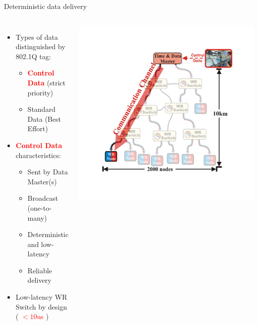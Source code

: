 \documentclass[compress,red]{beamer}
\begin{document}
\begin{frame}{Deterministic data delivery}

\begin{columns}[c]
    \begin{itemize}
      \item Types of data distinguished by 802.1Q tag:
	  \begin{itemize}
	    \item \textcolor{red}{\bf Control Data} (strict priority)
	    \item Standard Data (Best Effort)
	  \end{itemize}
	  \item \textcolor{red}{\bf Control Data} characteristics:
	  \begin{itemize}
      \item Sent by Data Master(s)
	    \item Broadcast (one-to-many)
	    \item Deterministic and low-latency
	    \item Reliable delivery
	  \end{itemize}
    \item Low-latency WR Switch by design ( \textcolor{red}{$<10$us} )
    \end{itemize}
    \begin{center}
    \includegraphics[height=0.65\textheight]{robustness/communication_channel-pro.jpg}
    \end{center}

\end{columns}
\end{frame}
\end{document}

